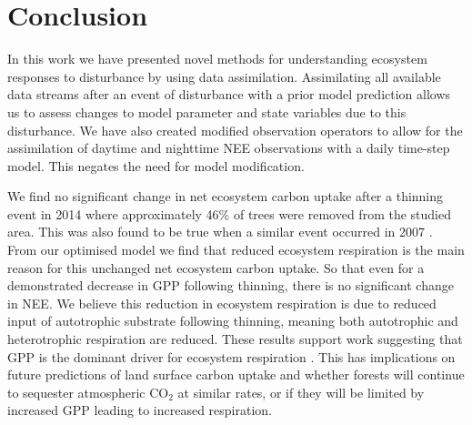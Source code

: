 \documentclass[draft,linenumbers]{agujournal}
\begin{document}

\section{Conclusion}

In this work we have presented novel methods for understanding ecosystem responses to disturbance by using data assimilation. Assimilating all available data streams after an event of disturbance with a prior model prediction allows us to assess changes to model parameter and state variables due to this disturbance. We have also created modified observation operators to allow for the assimilation of daytime and nighttime NEE observations with a daily time-step model. This negates the need for model modification.

We find no significant change in net ecosystem carbon uptake after a thinning event in 2014 where approximately 46\% of trees were removed from the studied area. This was also found to be true when a similar event occurred in 2007 \citep{wilkinson2015effects}. From our optimised model we find that reduced ecosystem respiration is the main reason for this unchanged net ecosystem carbon uptake. So that even for a demonstrated decrease in GPP following thinning, there is no significant change in NEE. We believe this reduction in ecosystem respiration is due to reduced input of autotrophic substrate following thinning, meaning both autotrophic and heterotrophic respiration are reduced. These results support work suggesting that GPP is the dominant driver for ecosystem respiration  \citep{GCB:GCB412, heinemeyer2012exploring, PCE:PCE1053, hogberg2006towards, ELE:ELE12097}. This has implications on future predictions of land surface carbon uptake and whether forests will continue to sequester atmospheric CO\(_{2}\) at similar rates, or if they will be limited by increased GPP leading to increased respiration. 





\end{document}
